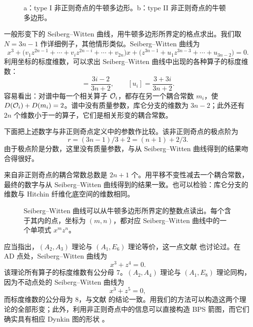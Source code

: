 \begin{figure}[tbp]
\centering

\caption{a：type I 非正则奇点的牛顿多边形。b：type II 非正则奇点的牛顿多边形。}
\label{fig:8}
\end{figure}

一般形变下的 Seiberg--Witten 曲线，用牛顿多边形所界定的格点求出。我们取 $N = 3n-1$ 作详细例子，其他情形类似。Seiberg--Witten 曲线为
\begin{equation}
x^3 + \bigl(v_1z^{2n-1} + \cdots + v_iz^{2n-i} + \cdots + v_{2n}\bigr)x
+ \bigl(z^{3n-1} + u_1z^{3n-3} + \cdots + u_{3n-2}\bigr) = 0 .
\label{eq:5.7}\tag{5.7}
\end{equation}
利用坐标的标度维数，可以求出 Seiberg--Witten 曲线中出现的各种算子的标度维数：
\begin{equation}
[v_i] = \frac{3i-2}{3n+2},\qquad [u_i] = \frac{3+3i}{3n+2}.
\label{eq:5.8}\tag{5.8}
\end{equation}
容易看出：对谱中每一个相关算子 $\mathcal{O}_i$，都存在另一个耦合常数 $m_i$，使 $D(\mathcal{O}_i)+D(m_i)=2$。谱中没有质量参数，库仑分支的维数为 $3n-2$；此外还有 $2n$ 个维数小于一的算子，它们是相关形变的耦合常数。

下面把上述数字与非正则奇点定义中的参数作比较。该非正则奇点的极点阶为
\begin{equation}
r = (3n-1)/3 + 2 = (n+1) + 2/3 .
\label{eq:5.9}\tag{5.9}
\end{equation}
由于极点阶是分数，这里没有质量参数，与从 Seiberg--Witten 曲线得到的结果吻合得很好。

来自非正则奇点的耦合常数总数是 $2n+1$ 个。用平移不变性减去一个耦合常数，最终的数字与从 Seiberg--Witten 曲线得到的结果一致。也可以检验：库仑分支的维数与 Hitchin 纤维化底空间的维数相同。

\begin{figure}[tbp]
\centering

\caption{Seiberg--Witten 曲线可以从牛顿多边形所界定的整数点读出。每个含于其内的点，坐标为 $(m,n)$，都对应 Seiberg--Witten 曲线中的一个单项式 $x^mz^n$。}
\label{fig:9}
\end{figure}

应当指出，$(A_2,A_3)$ 理论与 $(A_1,E_6)$ 理论等价，这一点文献 \cite{17} 也讨论过。在 AD 点处，Seiberg--Witten 曲线为
\begin{equation}
x^3 + z^4 = 0 .
\label{eq:5.10}\tag{5.10}
\end{equation}
该理论所有算子的标度维数有公分母 $7$。$(A_2,A_4)$ 理论与 $(A_1,E_8)$ 理论同构，因为不动点处的 Seiberg--Witten 曲线为
\begin{equation}
x^3 + z^5 = 0 ,
\label{eq:5.11}\tag{5.11}
\end{equation}
而标度维数的公分母为 $8$，与文献 \cite{17} 的结论一致。用我们的方法可以构造这两个理论的全部形变；此外，利用非正则奇点中的信息可以直接构造 BPS 箭图，而它们确实具有相应 Dynkin 图的形状 \cite{30}。

